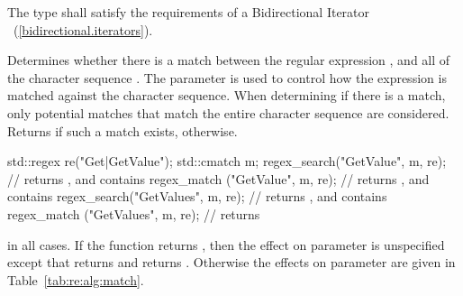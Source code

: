 \begin{itemdescr}
\pnum
\requires  The type  shall satisfy the requirements
of a Bidirectional Iterator ~(\ref{bidirectional.iterators}).

\pnum
\effects  Determines whether there is a match between the
regular expression , and all of the character
sequence . The parameter  is
used to control how the expression is matched against the character
sequence. When determining if there is a match, only potential matches
that match the entire character sequence are considered.
Returns  if such a match exists, 
otherwise.
\begin{example}
\begin{codeblock}
std::regex re("Get|GetValue");
std::cmatch m;
regex_search("GetValue", m, re);	// returns , and  contains 
regex_match ("GetValue", m, re);	// returns , and  contains 
regex_search("GetValues", m, re);	// returns , and  contains 
regex_match ("GetValues", m, re);	// returns 
\end{codeblock}
\end{example}

\pnum
\postconditions
{} in all cases.
If the function returns , then the effect
on parameter  is unspecified except that 
returns  and  returns .
Otherwise the effects on parameter  are given in
Table~\ref{tab:re:alg:match}.
\end{itemdescr}

